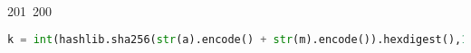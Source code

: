 201~200~\documentclass{article}
\begin{document}
\begin{lstlisting}[language=Python, caption=Signature Chall 4]
	                                                                        	                                                                    	                                	                    	                    	                        	                        	                    	                                                                	                	                                                                    	                    							                                                                                                                                                                                                    		                                                                                                                        				    			                                                                            k = int(hashlib.sha256(str(a).encode() + str(m).encode()).hexdigest(),16)
	                                                                        	                                                                    	                                	                    	                    	                        	                        	                    	                                                                	                	                                                                    	                    							                                                                                                                                                                                                    		                                                                                                                        				    			                                                                                (x1,y1) = (k*G).xy()
	                                                                        	                                                                    	                                	                    	                    	                        	                        	                    	                                                                	                	                                                                    	                    							                                                                                                                                                                                                    		                                                                                                                        				    			                                                                                    r = F(x1)

\end{lstlisting}
\end{document}
